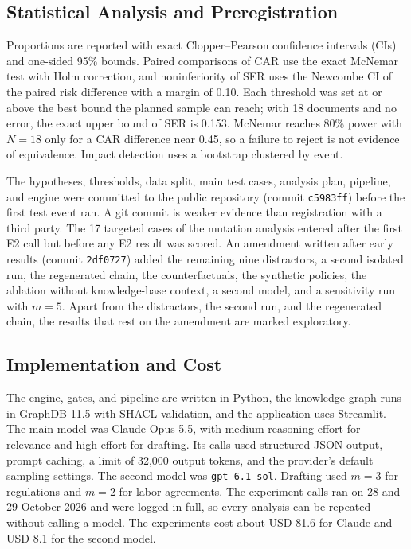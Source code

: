 \subsection{Statistical Analysis and Preregistration}
Proportions are reported with exact Clopper--Pearson confidence intervals (CIs) and one-sided 95\% bounds. Paired comparisons of CAR use the exact McNemar test with Holm correction, and noninferiority of SER uses the Newcombe CI of the paired risk difference with a margin of 0.10. Each threshold was set at or above the best bound the planned sample can reach; with 18 documents and no error, the exact upper bound of SER is 0.153. McNemar reaches 80\% power with $N = 18$ only for a CAR difference near 0.45, so a failure to reject is not evidence of equivalence. Impact detection uses a bootstrap clustered by event.

The hypotheses, thresholds, data split, main test cases, analysis plan, pipeline, and engine were committed to the public repository (commit \texttt{c5983ff}) before the first test event ran. A git commit is weaker evidence than registration with a third party. The 17 targeted cases of the mutation analysis entered after the first E2 call but before any E2 result was scored. An amendment written after early results (commit \texttt{2df0727}) added the remaining nine distractors, a second isolated run, the regenerated chain, the counterfactuals, the synthetic policies, the ablation without knowledge-base context, a second model, and a sensitivity run with $m = 5$. Apart from the distractors, the second run, and the regenerated chain, the results that rest on the amendment are marked exploratory.

\subsection{Implementation and Cost}
The engine, gates, and pipeline are written in Python, the knowledge graph runs in GraphDB 11.5 with SHACL validation, and the application uses Streamlit. The main model was Claude Opus 5.5, with medium reasoning effort for relevance and high effort for drafting. Its calls used structured JSON output, prompt caching, a limit of 32,000 output tokens, and the provider's default sampling settings. The second model was \texttt{gpt-6.1-sol}. Drafting used $m = 3$ for regulations and $m = 2$ for labor agreements. The experiment calls ran on 28 and 29 October 2026 and were logged in full, so every analysis can be repeated without calling a model. The experiments cost about USD 81.6 for Claude and USD 8.1 for the second model.
